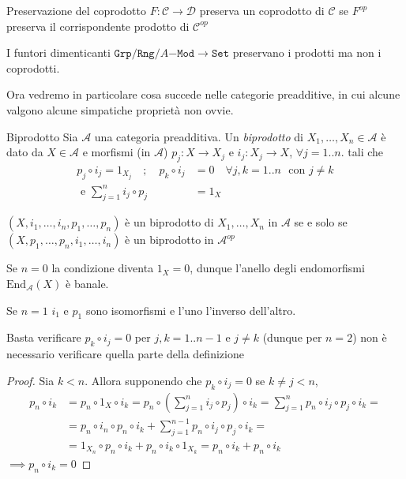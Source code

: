 \begin{definition}{Preservazione del coprodotto}
    \(F: \mathcal{\mathcal{C}} \to \mathcal{D}\) preserva un coprodotto di \(\mathcal{\mathcal{C}}\) se \(F^{op}\) preserva il
    corrispondente prodotto di \(\mathcal{C}^{op}\) 
\end{definition}

\begin{example}{}
    I funtori dimenticanti \(\mathtt{Grp}/\mathtt{Rng}/A\mathtt{-Mod} \to \mathtt{Set}\) preservano i prodotti ma non i coprodotti.
\end{example}

Ora vedremo in particolare cosa succede nelle categorie preadditive, in cui
alcune valgono alcune simpatiche proprietà non ovvie.

\begin{definition}{Biprodotto}
    Sia \(\mathcal{A}\) una categoria preadditiva. Un \emph{biprodotto} di \(X_{1}, \dots, X_{n} \in \mathcal{A}\) 
    è dato da \(X \in \mathcal{A}\) e morfismi (in \(\mathcal{A}\)) \(p_{j}: X\to X_j\) e \(i_{j}:
    X_j \to X\), \(\forall j=1.. n\).
    tali che
    \begin{align*}
        p_{j}\circ i_{j} = 1_{X_{j}} \quad ; \quad p_k \circ i_{j} &= 0 \quad \forall j,k=1 .. n \,\, \text{ con }j \neq k \\
        \text{ e }\sum_{j=1}^{n} i_{j} \circ p_j &= 1_X 
    \end{align*}
\end{definition}
\begin{remark}{}
    \({(X, i_{1}, \dots, i_n, p_{1}, \dots, p_n )}\) è un biprodotto di \(X_{1}, \dots, X_{n}\) in \(\mathcal{A}\) 
    se e solo se \({(X, p_{1}, \dots, p_n, i_1, \dots, i_n)}\) è un biprodotto
    in \(\mathcal{A}^{op}\) 
\end{remark}
Se \(n = 0\) la condizione diventa \(1_X = 0\), dunque l'anello degli
endomorfismi \(\mathrm{End}_{\mathcal{A}} {(X)}\) è banale.

Se \(n = 1\) \(i_{1}\) e \(p_{1}\) sono isomorfismi e l'uno l'inverso
dell'altro.

\begin{remark}{}
Basta verificare \(p_k \circ i_{j} = 0\) per \(j,k=1. .n-1\) e \(j\neq k\)
(dunque per \(n=2\)) non è necessario verificare quella parte della definizione
\end{remark}
\begin{proof}{}
    Sia \(k < n\). Allora supponendo che \(p_k \circ i_j = 0\) se \(k \neq j < n\),
    \begin{align*}
        p_n \circ i_k &= p_n \circ 1_X \circ i_k = p_n \circ {\left( \sum_{j=1}^{n} i_j \circ p_j  \right)} \circ i_k = \sum_{j=1}^{n} p_n \circ i_j \circ p_j \circ i_k = \\
        &= p_n \circ i_n \circ p_n \circ i_k + \sum_{j=1}^{n-1} p_n \circ i_j
        \circ p_j \circ i_k = \\
        &= 1_{X_{n}} \circ p_n \circ i_k + p_{n} \circ
        i_k \circ 1_{X_k} = p_{n} \circ i_k + p_{n} \circ i_k
    \end{align*}
    \(\implies p_{n} \circ i_k = 0\) 
\end{proof}

